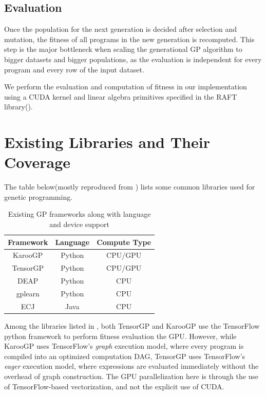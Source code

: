 \subsection{Evaluation}
\label{subsec:evaluation}
Once the population for the next generation is decided after selection and mutation, the fitness of all programs in the new generation is recomputed. This step is the major bottleneck when scaling the generational GP algorithm to bigger datasets and bigger populations, as the evaluation is independent for every program and every row of the input dataset. 

We perform the evaluation and computation of fitness in our implementation using a CUDA kernel and linear algebra primitives specified in the RAFT library(\citep{raschka2020machine}).

\section{Existing Libraries and Their Coverage}
\label{sec:otherlibs}
The table below(mostly reproduced from \cite{baeta2021speed}) lists some common libraries  used for genetic programming.  

\begin{table}[htbp]
  \caption{Existing GP frameworks along with language and device support}
  \begin{center}
      \begin{tabular}[c]{ccc}
          \toprule
          \textbf{Framework} &   \textbf{Language} & \textbf{Compute Type} \\
          \midrule
          KarooGP & Python & CPU/GPU \\
          TensorGP & Python & CPU/GPU \\
          DEAP & Python & CPU \\
          gplearn  & Python & CPU \\
          ECJ & Java & CPU \\
          \bottomrule
      \end{tabular}
      \label{tab:otherlibs}
  \end{center}
\end{table}

Among the libraries listed in , both TensorGP\citep{baeta2021tensorgp} and KarooGP\citep{staats2017tensorflow} use the TensorFlow python framework to perform fitness evaluation the GPU. However, while KarooGP uses TensorFlow's \textit{graph} execution model, where every program is compiled into an optimized computation DAG, TensorGP uses TensorFlow's \textit{eager} execution model\citep{agrawal2019tensorflow}, where expressions are evaluated immediately without the overhead of graph construction. The GPU parallelization here is through the use of TensorFlow-based vectorization, and not the explicit use of CUDA. 

